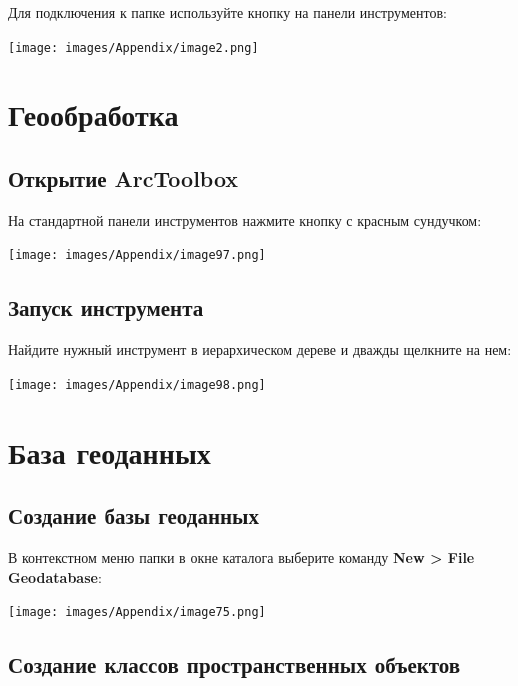 \documentclass[12pt,]{book}
\begin{document}
Для подключения к папке используйте кнопку на панели инструментов:

\texttt{[image: images/Appendix/image2.png]}

\hypertarget{manual-toolbox}{%
\chapter{Геообработка}\label{manual-toolbox}}

\hypertarget{arctoolbox}{%
\section{Открытие ArcToolbox}\label{arctoolbox}}

На стандартной панели инструментов нажмите кнопку с красным сундучком:

\texttt{[image: images/Appendix/image97.png]}

\hypertarget{section-7}{%
\section{Запуск инструмента}\label{section-7}}

Найдите нужный инструмент в иерархическом дереве и дважды щелкните на нем:

\texttt{[image: images/Appendix/image98.png]}

\hypertarget{manual-gdb}{%
\chapter{База геоданных}\label{manual-gdb}}

\hypertarget{manual-gdb-create}{%
\section{Создание базы геоданных}\label{manual-gdb-create}}

В контекстном меню папки в окне каталога выберите команду \textbf{New \textgreater{} File Geodatabase}:

\texttt{[image: images/Appendix/image75.png]}

\hypertarget{manual-gdb-create-class}{%
\section{Создание классов пространственных объектов}\label{manual-gdb-create-class}}
\end{document}
